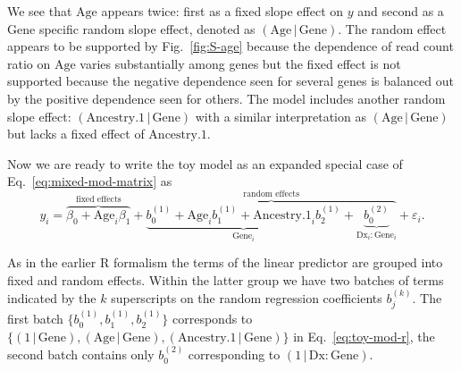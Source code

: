 \documentclass[letterpaper]{article}
\begin{document}
We see that \(\mathrm{Age}\) appears twice: first as a fixed slope effect on \(y\) and
second as a \(\mathrm{Gene}\) specific random slope effect, denoted as
\((\mathrm{Age}\,|\,\mathrm{Gene})\).  The random effect appears to be
supported by Fig.~\ref{fig:S-age} because the dependence of read count ratio
on \(\mathrm{Age}\) varies substantially among genes but the fixed effect is not
supported because the negative dependence seen for several genes is balanced
out by the positive dependence seen for others.  The model includes another
random slope effect: \((\mathrm{Ancestry.1}\,|\,\mathrm{Gene})\) with a
similar interpretation as \((\mathrm{Age}\,|\,\mathrm{Gene})\) but lacks a
fixed effect of \(\mathrm{Ancestry.1}\).

Now we are ready to write the toy model as an expanded special case of
Eq.~\ref{eq:mixed-mod-matrix} as
\begin{equation}
\label{eq:toy-mod-math}
y_{i} = \overbrace{\beta_0 + \mathrm{Age}_{i}
\beta_1}^{\text{fixed effects}} +
\overbrace{\underbrace{b_{0}^{(1)} + \mathrm{Age}_i b_1^{(1)} +
\mathrm{Ancestry.1}_i b_{2}^{(1)}}_{\mathrm{Gene}_i} +
\underbrace{b_{0}^{(2)}}_{\mathrm{Dx}_i:\mathrm{Gene}_i}}^{\text{random
effects}} + \varepsilon_i.
\end{equation}

As in the earlier R formalism the terms of the linear predictor
are grouped into fixed and random effects.  Within the latter group we have
two batches of terms indicated by the \(k\) superscripts on the random
regression coefficients \(b_j^{(k)}\).  The first batch
\(\{b_0^{(1)},b_1^{(1)},b_2^{(1)}\}\) corresponds to
\(\{(1\,|\,\mathrm{Gene}), (\mathrm{Age}\,|\,\mathrm{Gene}),
(\mathrm{Ancestry.1}\,|\,\mathrm{Gene})\}\) in Eq.~\ref{eq:toy-mod-r}, the
second batch contains only \(b_0^{(2)}\) corresponding to
\((1\,|\,\mathrm{Dx}:\mathrm{Gene})\).
\end{document}
